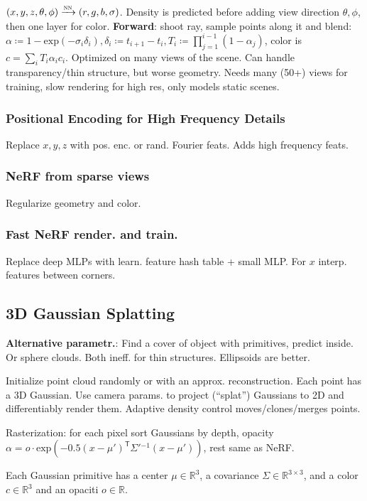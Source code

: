 \documentclass[11pt,landscape,a4paper,fleqn]{article}
\newcommand*{\tran}{^{\mathsf{T}}} %
\newcommand{\R}{\mathbb{R}}
\renewcommand{\exp}{\mathrm{exp}}
\begin{document}
\begin{multicols*}{4}
$(x, y, z, \theta, \phi) \xrightarrow{\textsc{nn}} (r, g, b, \sigma)$.
Density is predicted before adding view direction $\theta, \phi$,
then one layer for color.
\textbf{Forward}: shoot ray, sample points along it and blend:
$\alpha \coloneqq 1 - \exp( - \sigma_i \delta_i), \delta_i \coloneqq t_{i+1} - t_i,
T_i \coloneqq \prod_{j = 1}^{i-1}(1 - \alpha_j)$,
color is $c = \sum_i T_i \alpha_i c_i$.
Optimized on many views of the scene.
Can handle transparency/thin structure,
but worse geometry.
Needs many (50+) views for training, slow rendering for high res,
only models static scenes.

\subsubsection{Positional Encoding for High Frequency Details}
Replace $x, y, z$ with pos. enc. or rand. Fourier feats.
Adds high frequency feats.

\subsubsection{NeRF from sparse views} Regularize geometry and color.

\subsubsection{Fast NeRF render. and train.}
Replace deep MLPs with learn. feature hash table + small MLP.
For $x$ interp. features between corners.

\subsection{3D Gaussian Splatting}

\textbf{Alternative parametr.}:
Find a cover of object with primitives, predict inside.
Or sphere clouds. Both ineff. for thin structures.
Ellipsoids are better.

Initialize point cloud randomly or with an approx. reconstruction.
Each point has a 3D Gaussian.
Use camera params. to project (``splat'') Gaussians to 2D
and differentiably render them.
Adaptive density control moves/clones/merges points.

Rasterization: for each pixel sort Gaussians by depth, opacity
$\alpha = o \cdot \exp( - 0.5(x - \mu')\tran \Sigma'{}^{-1}(x - \mu'))$,
rest same as NeRF.

Each Gaussian primitive has a center $\mu \in \R^3$, a covariance $\Sigma \in \R^{3\times 3}$, and a color $c \in \R^3$ and an opaciti $o \in \R$.


\end{multicols*}
\end{document}
